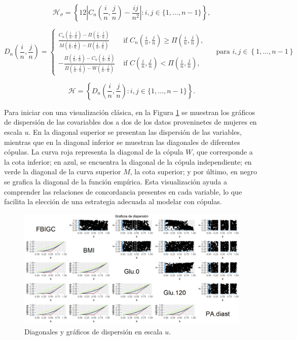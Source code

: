 \begin{equation}\label{Hsigma}
    \mathscr{H}_\sigma = \left\{12\left|C_n\left( \frac{i}{n}, \frac{j}{n}\right)-\frac{i j}{n^2}\right|: i, j \in\{1, \ldots, n-1\}\right\},
\end{equation}


\begin{equation}\label{D}
    D_n\left(\frac{i}{n}, \frac{j}{n}\right)=\left\{\begin{array}{cc}
\frac{C_n\left(\frac{i}{n}, \frac{j}{n}\right)-\Pi\left(\frac{i}{n}, \frac{j}{n}\right)}{M\left(\frac{i}{n}, \frac{j}{n}\right)-\Pi\left(\frac{i}{n}, \frac{j}{n}\right)} & \text { if } C_n\left(\frac{i}{n}, \frac{j}{n}\right) \geq \Pi\left(\frac{i}{n}, \frac{j}{n}\right), \\
-\frac{\Pi\left(\frac{i}{n}, \frac{j}{n}\right)-C_n\left(\frac{i}{n}, \frac{j}{n}\right)}{\Pi\left(\frac{i}{n}, \frac{j}{n}\right)-W\left(\frac{i}{n}, \frac{j}{n}\right)} & \text { if } C\left(\frac{i}{n}, \frac{j}{n}\right)<\Pi\left(\frac{i}{n}, \frac{j}{n}\right),
\end{array}\right. \quad \text{ para } i,j \in  \left\{ 1, \dots, n-1 \right\} 
\end{equation}

\begin{equation}\label{H}
    \mathscr{H} =\left\{ D_n\left( \frac{i}{n}, \frac{j}{n}\right) : i, j \in\{1, \ldots, n-1\}\right\}.
\end{equation}


Para iniciar con una visualización clásica, en la Figura \ref{fig:diagE} se muestran los gráficos de dispersión de las covariables dos a dos de los datos proveninetes de mujeres en escala $u$. En la diagonal superior se presentan las dispersión de las variables, mientras que en la diagonal inferior se muestran las diagonales de diferentes cópulas. La curva roja representa la diagonal de la cópula $W$, que corresponde a la cota inferior; en azul, se encuentra la diagonal de la cópula independiente; en verde la diagonal de la curva superior $M$, la cota superior; y por último, en negro se grafica la diagonal de la función empírica. Esta visualización ayuda a comprender las relaciones de concordancia presentes en cada variable, lo que facilita la elección de una estrategia adecuada al modelar con cópulas.

\begin{figure}[H]
    \centering
    \includegraphics[width = 0.97 \textwidth]{4img/UdiagM.png}
    \caption{Diagonales y gráficos de dispersión en escala $u$.}
    \label{fig:diagE}
\end{figure}

